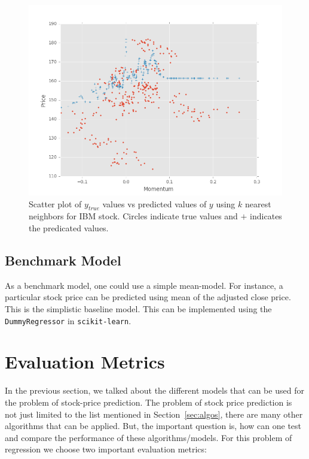 \documentclass[12pt]{article}
\begin{document}
\begin{itemize}
\begin{figure}[!htbp]
\begin{center}
\includegraphics[height=0.4\textheight,width=\textwidth]{knn_momentum_fit.png}
\caption{Scatter plot of $y_{true}$ values vs predicted values of $y$ using $k$ nearest neighbors for IBM stock. Circles indicate true values and $+$ indicates the predicated values. }
\label{fig:knn_example}
\end{center}
\end{figure}


\subsection{Benchmark Model}
\label{sec:bench}
As a benchmark model, one could use a simple mean-model. For instance, a particular stock price can be predicted using mean of the adjusted close price. This  is the simplistic baseline model. This can be implemented using the \texttt{DummyRegressor} \cite{scikit-dummy} in \texttt{scikit-learn}.



\section{Evaluation Metrics}
\label{sec:metrics}

In the previous section, we talked about the different models that can be used for the problem of stock-price prediction. The problem of stock price prediction is not just limited to the list mentioned in Section~\ref{sec:algos}, there are many other algorithms that can be applied. But, the important question is, how can one test and compare the performance of these algorithms/models. For this problem of regression we choose two important evaluation metrics:


\end{itemize}
\end{document}
